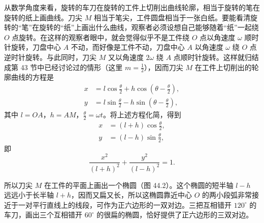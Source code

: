从数学角度来看，旋转的车刀在旋转的工件上切削出曲线轮廓，相当于旋转的笔在旋转的纸上画曲线。刀尖 $M$ 相当于笔尖，工件圆盘相当于一张白纸。要能看清旋转的“笔”在旋转的“纸”上画出什么曲线，观察者必须设想自己能够随着“纸”一起绕 $O$ 点旋转。在这样的观察者眼中，就会觉得似乎不是工件绕 $O$ 点以角速度 $\omega$ 顺时针旋转，刀盘中心 $A$ 不动，而好像是工件不动，刀盘中心 $A$ 以角速度 $\omega$ 绕 $O$ 点逆时针旋转。与此同时，刀尖 $M$ 又以角速度 $2\omega$ 绕 $A$ 点顺时针旋转。这样就归结成第 43 节中已经讨论过的情形（这里 $m=\frac{1}{2}$），因而刀尖 $M$ 在工件上切削出的轮廓曲线的方程是
\begin{align*}
  x &= l\cos\frac{\theta}{2} + h\cos\left(\theta - \frac{\theta}{2}\right), \\
  y &= l\sin\frac{\theta}{2} - h\sin\left(\theta - \frac{\theta}{2}\right),
\end{align*}
其中 $l=OA$，$h=AM$，$\frac{\theta}{2}=\omega t$。将上述方程化简，得到
\begin{align*}
  x &= (l+h)\cos\frac{\theta}{2}, \\
  y &= (l-h)\sin\frac{\theta}{2},
\end{align*}
即
\[
  \frac{x^2}{(l+h)^2} + \frac{y^2}{(l-h)^2} = 1.
\]

\noindent
\begin{minipage}[c]{0.44\textwidth}
  \centering
\end{minipage}%
\hfill
\begin{minipage}[c]{0.53\textwidth}
所以刀尖 $M$ 在工件的平面上画出一个椭圆（图 44.2）。这个椭圆的短半轴 $l-h$ 远远小于长半轴 $l+h$，因而又扁又长，所以这椭圆靠近中心 $O$ 的两小段弧非常接近于一对平行直线上的线段，可作为正六边形的一双对边。三把互相错开 $120^\circ$ 的车刀，画出三个互相错开 $60^\circ$ 的很扁的椭圆，恰好提供了正六边形的三双对边。
\end{minipage}
